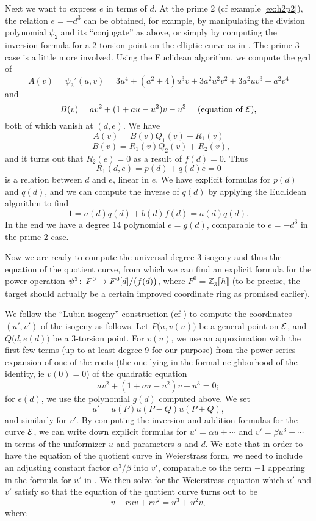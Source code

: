 \documentclass{gtpart}
\theoremstyle{definition}
\theoremstyle{remark}
\def\co{\colon\thinspace}
\newcommand{\mb}[1]{\mathbb{#1}}
\begin{document}
Next we want to express $e$ in terms of $d$.  At the prime 2 (cf example \ref{ex:h2p2}), 
the relation $e = -d^3$ can be obtained, for example, by manipulating the division polynomial 
$\psi_2$ and its ``conjugate'' as above, or simply by computing the inversion formula 
for a 2-torsion point on the elliptic curve as in \cite{h2p2}.  The prime 3 
case is a little more involved.  Using the Euclidean algorithm, we compute the gcd of 
\[
 A(v) = \psi_3'(u,v) = 3u^4 + (a^2 + 4) u^3 v + 3a^2 u^2 v^2 + 3a^2 u v^3 + a^2 v^4
\]
and 
\[
 B(v) = a v^2 + (1 + a u - u^2) v - u^3~~~~\text{(equation of $\cal E$)},
\]
both of which vanish at $(d,e)$.  We have
\[
 A(v) = B(v)Q_1(v) + R_1(v)
\]
\[
 ~~~B(v) = R_1(v)Q_2(v) + R_2(v),
\]
and it turns out that $R_2(e) = 0$ as a result of $f(d) = 0$.  Thus
\[
 R_1(d,e) = p(d) + q(d) e = 0
\]
is a relation between $d$ and $e$, linear in $e$.  We have explicit formulas for $p(d)$ and $q(d)$, 
and we can compute the inverse of $q(d)$ by applying the Euclidean algorithm to find 
\[
 1 = a(d)q(d) + b(d)f(d) = a(d)q(d).
\]
In the end we have a degree 14 polynomial $e = g(d)$, comparable to $e = -d^3$ in the prime 2 case.  

Now we are ready to compute the universal degree 3 isogeny and thus the equation of the quotient curve, 
from which we can find an explicit formula for the power operation $\psi^3\co F^0  \to F^0 [d] / \big(f(d)\big)$, where $F^0 = {\mb Z}_3 \llbracket h \rrbracket$
(to be precise, the target should actually be a certain improved coordinate ring as promised earlier).  

We follow the ``Lubin isogeny'' construction (cf \cite[proof of theorem 1.4]{lubin}) to compute the coordinates $(u',v')$ of the isogeny as follows.  
Let $P\big(u,v(u)\big)$ be a general point on $\cal E$, and $Q\big(d,e(d)\big)$ be a 3-torsion point.  For 
$v(u)$, we use an appoximation with the first few terms (up to at least degree 9 for our purpose) 
from the power series expansion of one of the roots (the one lying in the formal neighborhood of the identity, ie $v(0)=0$) of the quadratic equation 
\[
 a v^2 + (1 + a u - u^2) v - u^3 = 0;
\]
for $e(d)$, we use the polynomial $g(d)$ computed above.  We set 
\[
 u' = u(P) u(P-Q) u(P+Q),
\]
and similarly for $v'$.  By computing the inversion and addition formulas for the curve $\cal E$, 
we can write down explicit formulas for $u' = \alpha u + \cdots$ and $v' = \beta u^3 + \cdots$ in terms of the 
uniformizer $u$ and parameters $a$ and $d$.  We note that in order to have the equation of the quotient curve in Weierstrass form, 
we need to include an adjusting constant factor $\alpha^3 / \beta$ into $v'$, comparable to the term $-1$ appearing in the formula for $u'$ in \cite{h2p2}.  
We then solve for the Weierstrass equation which $u'$ and $v'$ satisfy so that the equation of the quotient curve turns out to be 
\[
 v + r u v + r v^2 = u^3 + u^2 v,
\]
where
\end{document}
